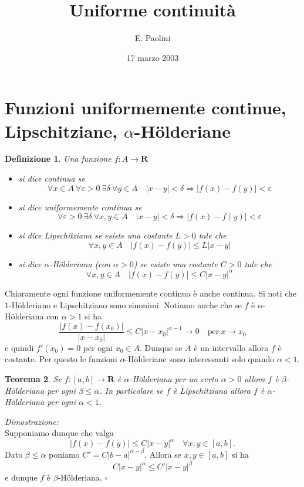 \documentclass[italian,a4paper]{article}
\title{\bf Uniforme continuit\`a}
\author{E. Paolini}
\date{17 marzo 2003}
\newcommand{\R}{\mathbf{R}}
\renewcommand{\epsilon}{\varepsilon}
\newtheorem{theorem}{Teorema}
\newtheorem{definition}[theorem]{Definizione}
\newenvironment{proof}
        {%
                {}%
                {%
                }%
        \noindent%
        {\it Dimostrazione:}\\%
        }%
        {%
        \hfill$\square$%
        }
\begin{document}
\maketitle
\section{Funzioni uniformemente continue, Lipschitziane, $\alpha$-H\"o{}lderiane}
\begin{definition}
Una funzione $f\colon A\to \R$ 
\begin{itemize}
\item
si dice \emph{continua} se
\[
\forall x \in A\ \forall \epsilon>0\ \exists\delta\ \forall y\in A\quad
\vert x-y\vert < \delta \Rightarrow \vert f(x)-f(y)\vert <\epsilon
\]
\item
si dice \emph{uniformemente continua} se
\[
	\forall \epsilon>0\ \exists \delta\ 
	\forall x,y\in A\quad
	\vert x-y\vert < \delta \Rightarrow \vert f(x)-f(y)\vert <\epsilon
\]
\item
si dice \emph{Lipschitziana} se esiste
una costante $L>0$ tale che
\[
	\forall x,y\in A\quad
	\vert f(x) - f(y)\vert \le L \vert x-y\vert
\]
\item
si dice \emph{$\alpha$-H\"o{}lderiana} (con $\alpha>0$) se esiste
una costante $C>0$ tale che
\[
	\forall x,y\in A\quad
	\vert f(x) - f(y)\vert \le C \vert x-y\vert^\alpha
\] 
\end{itemize}
\end{definition}

Chiaramente ogni funzione uniformemente continua \`e anche continua.
Si noti che $1$-H\"o{}lderiano e Lipschitziano sono sinonimi. 
Notiamo anche che se $f$ \`e $\alpha$-H\"o{}lderiana con $\alpha>1$ si ha
\[
	\frac{\vert f(x)-f(x_0)\vert}{\vert x-x_0\vert}
	\le C \vert x-x_0\vert^{\alpha-1}\to 0\quad\mathrm{per}\
	x\to x_0
\]
e quindi $f'(x_0)=0$ per ogni $x_0\in A$. Dunque se $A$ \`e un
intervallo allora $f$ \`e costante. Per questo le funzioni
$\alpha$-H\"o{}lderiane sono interessanti solo quando $\alpha < 1$.

\begin{theorem}
Se $f\colon [a,b]\to \R$ \`e $\alpha$-H\"o{}lderiana per un certo
$\alpha>0$ allora $f$ \`e $\beta$-H\"o{}lderiana per ogni $\beta\le \alpha$.
In particolare se $f$ \`e Lipschitziana allora $f$ \`e
$\alpha$-H\"o{}lderiana per ogni $\alpha<1$.
\end{theorem}
\begin{proof}
Supponiamo dunque che valga 
\[
	\vert f(x)-f(y)\vert \le C \vert x-y\vert^\alpha\quad
	\forall x,y\in [a,b].
\]
Dato $\beta\le\alpha$ poniamo $C'=C\vert b-a\vert^{\alpha-\beta}$.
Allora se $x,y\in[a,b]$ si ha
\[
	C \vert x-y\vert^\alpha \le C' \vert x-y\vert^\beta
\]
e dunque $f$ \`e $\beta$-H\"o{}lderiana.
\end{proof}
\end{document}
